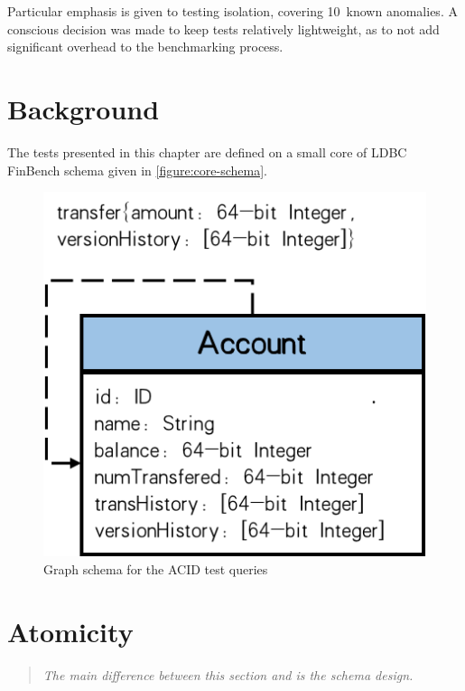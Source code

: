 Particular emphasis is given to testing isolation, covering 10~known anomalies.
A conscious decision was made to keep tests relatively lightweight, as to not 
add significant overhead to the benchmarking process.

\section{Background}

The tests presented in this chapter are defined on a small core of LDBC FinBench
schema given in \autoref{figure:core-schema}.

\begin{figure}[htbp]
    \centering
    \includegraphics[scale=0.5]{figures/acid/acid-schema}
    \caption{Graph schema for the ACID test queries}
    \label{figure:core-schema}
\end{figure}

\begin{figure}[h]
  \centering
  
\end{figure}

\section{Atomicity}

\begin{quote}
  \textit{The main difference between this section and \ldbcsnb\xspace
          is the schema design.
  }
\end{quote}

